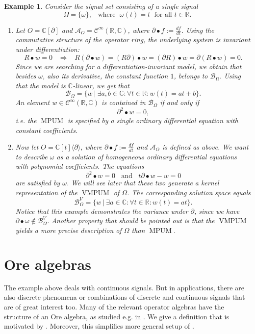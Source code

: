 \documentclass[a4paper,10pt]{article}
\newtheorem{ex}[Th]{Example}
\theoremstyle{nonumberplain}
\newcommand{\R}{\mathbb{R}}
\newcommand{\C}{\mathbb{C}}
\DeclareMathOperator{\MPUM}{MPUM}
\DeclareMathOperator{\VMPUM}{VMPUM}
\begin{document}
\begin{ex}\label{MotivatingExample}
Consider the signal set consisting of a single signal 
$$\Omega= \lbrace \omega \rbrace, \;\;\; \mbox{where } \; \omega(t)=t \;  \mbox{ for all  } t \in \R .$$ 
\begin{enumerate}
\item Let $O=\C[\partial]$ and $\mathcal{A}_O=\mathcal{C}^\infty(\R,\C)$, where 
$\partial \bullet f := \frac{df}{dt}$. Using the commutative structure of the operator ring, the underlying system is invariant under 
differentiation:
$$ R \bullet w = 0 \;\;\; \Rightarrow \;\;\; R ( \partial \bullet w ) = 
( R \partial ) \bullet w =  ( \partial R ) \bullet w
=   \partial ( R \bullet w) =0.$$
Since we are searching for a differentiation-invariant model, we obtain that besides $\omega$, also 
its derivative, the constant function $1$, belongs to $\mathcal{B}_{\Omega} $. Using that the model is $\C$-linear, we get that
$$\mathcal{B}_{\Omega} = \{ w  \ | \ \exists a,b \in \C: \forall t\in \R : w(t)=at+b \}.$$
An element $w \in  \mathcal{C}^\infty(\R,\C)$ is contained in $\mathcal{B}_\Omega$ if and only if
$$\partial^2 \bullet w=0,$$
i.e. the $\MPUM$ is specified by a single ordinary differential equation with constant coefficients.
\item Now let $O=\C[t]\langle \partial \rangle$, where 
$\partial \bullet f := \frac{df}{dt}$ and $\mathcal{A}_O$ is defined as above. We want to describe 
$\omega$ as a solution of homogeneous ordinary differential equations with polynomial coefficients. The 
equations $$\partial^2 \bullet w=0 \;\; \mbox{ and } \;\; t \partial \bullet  w-w=0 $$
are satisfied by $\omega$. We will see later that these two generate a kernel representation of the $\VMPUM$ of $\Omega$.
The corresponding solution space equals $$\mathcal{B}_\Omega^V=\{ w \ | \ \exists a \in \C : \forall t\in{\R} : w(t)=at\}.$$
Notice that this example demonstrates the variance under $\partial$, since we have
$ \partial \bullet \omega \notin \mathcal{B}_\Omega^V$.
Another property that should be pointed out is that the $\VMPUM$ yields a more
precise description of $\Omega$ than $\MPUM$.
\end{enumerate}
\end{ex}


\section{Ore algebras}

The example above deals with continuous signals. But in applications, there are also 
discrete phenomena or combinations of discrete and continuous signals that are of great interest too.
Many of the relevant operator algebras have the structure of an Ore algebra, as studied e.g. in
\cite{CQR, CQR2, CS}. 
We give a definition that is motivated by \cite{CS}. Moreover, this simplifies more
general setup of \cite{Kr}.
\end{document}
